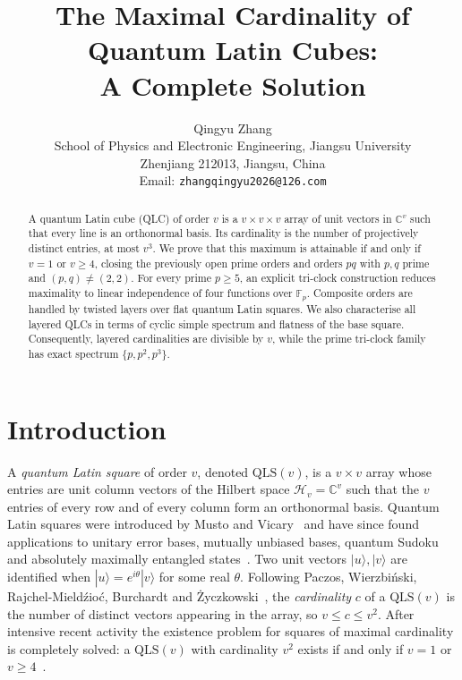 \documentclass[11pt]{amsart}
\author@andify\authors
\title[The Maximal Cardinality of Quantum Latin Cubes: A Complete Solution]
{The Maximal Cardinality of Quantum Latin Cubes:\\ A Complete Solution}
\author{Qingyu Zhang\\
{\small School of Physics and Electronic Engineering, Jiangsu University}\\
{\small Zhenjiang 212013, Jiangsu, China}\\
{\small Email: \texttt{zhangqingyu2026@126.com}}}
\date{}
\theoremstyle{definition}
\newcommand{\C}{\mathbb{C}}
\newcommand{\F}{\mathbb{F}}
\newcommand{\ket}[1]{|#1\rangle}
\newcommand{\QLS}{\mathrm{QLS}}
\begin{document}
\begin{abstract}
A quantum Latin cube (QLC) of order $v$ is a $v\times v\times v$ array of
unit vectors in $\C^v$ such that every line is an orthonormal basis.  Its
cardinality is the number of projectively distinct entries, at most $v^3$.
We prove that this maximum is attainable if and only if $v=1$ or $v\ge4$,
closing the previously open prime orders and orders $pq$ with $p,q$ prime
and $(p,q)\ne(2,2)$.  For every prime $p\ge5$, an explicit tri-clock
construction reduces maximality to linear independence of four functions
over $\F_p$.  Composite orders are handled by twisted layers over flat
quantum Latin squares.  We also characterise all layered QLCs in terms of
cyclic simple spectrum and flatness of the base square.  Consequently,
layered cardinalities are divisible by $v$, while the prime tri-clock family
has exact spectrum $\{p,p^2,p^3\}$.
\end{abstract}

\maketitle
\pagestyle{plain}
\makeatletter
\def\@oddhead{}%
\def\@evenhead{}%
\makeatother

\section{Introduction}\label{sec:intro}

A \emph{quantum Latin square} of order $v$, denoted $\QLS(v)$, is a $v\times
v$ array whose entries are unit column vectors of the Hilbert space
$\mathcal H_v=\C^v$ such that the $v$ entries of every row and of every
column form an orthonormal basis.  Quantum Latin squares were introduced by
Musto and Vicary~\cite{MV2016} and have since found applications to unitary
error bases, mutually unbiased bases, quantum Sudoku and absolutely maximally
entangled states~\cite{Musto2017,NP2021,Paczos2021,Goyeneche2018}.  Two unit
vectors $\ket u,\ket v$ are identified when $\ket u=e^{i\theta}\ket v$ for
some real $\theta$.  Following Paczos, Wierzbi\'nski,
Rajchel-Mield\'zio\'c, Burchardt and \.Zyczkowski~\cite{Paczos2021}, the
\emph{cardinality} $c$ of a $\QLS(v)$ is the number of distinct vectors
appearing in the array, so $v\le c\le v^2$.  After intensive recent
activity
\cite{Paczos2021,ZhangCao2026,ZZLC2026,ZZTS2025,ZWJ2026,ZhangJi2026} the
existence problem for squares of maximal cardinality is completely solved: a
$\QLS(v)$ with cardinality $v^2$ exists if and only if $v=1$ or
$v\ge4$~\cite{Paczos2021,ZhangCao2026,ZZTS2025}.
\end{document}
